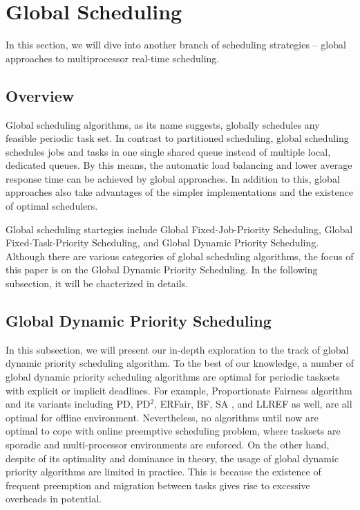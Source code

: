 \documentclass[preprint,12pt]{elsarticle}
\begin{document}
\newpage
\section{Global Scheduling} \label{S:4}
In this section, we will dive into another branch of scheduling strategies --
global approaches to multiprocessor real-time scheduling.

\subsection{Overview}
Global scheduling algorithms, as its name suggests, globally schedules any
feasible periodic task set. In contrast to partitioned scheduling, global
scheduling schedules jobs and tasks in one single shared queue instead of
multiple local, dedicated queues. By this means, the automatic load balancing
and lower average response time can be achieved by global approaches. In
addition to this, global approaches also take advantages of the simpler
implementations and the existence of optimal schedulers. 

Global scheduling startegies include Global Fixed-Job-Priority Scheduling,
Global Fixed-Task-Priority Scheduling, and Global Dynamic Priority Scheduling. 
Although there are various categories of global scheduling algorithms, the
focus of this paper is on the Global Dynamic Priority Scheduling. In the
following subsection, it will be chacterized in details. 

\subsection{Global Dynamic Priority Scheduling}
In this subsection, we will present our in-depth exploration to the track of
global dynamic priority scheduling algorithm. To the best of our knowledge, a
number of global dynamic priority scheduling algorithms are optimal for
periodic tasksets with explicit or implicit deadlines.
For example, Proportionate Fairness algorithm and its variants including PD,
PD$^2$, ERFair, BF, SA \cite{khemka1997optimal}, and LLREF
\cite{cho2006optimal} as well, are all optimal for offline environment.
Nevertheless, no algorithms until now are optimal to cope with online
preemptive scheduling problem, where tasksets are sporadic and multi-processor
environments are enforced.
On the other hand, despite of its optimality and dominance in theory, the
usage of global dynamic priority algorithms are limited in practice. This is
because the existence of frequent preemption and migration between tasks gives
rise to excessive overheads in potential. 
\end{document}
